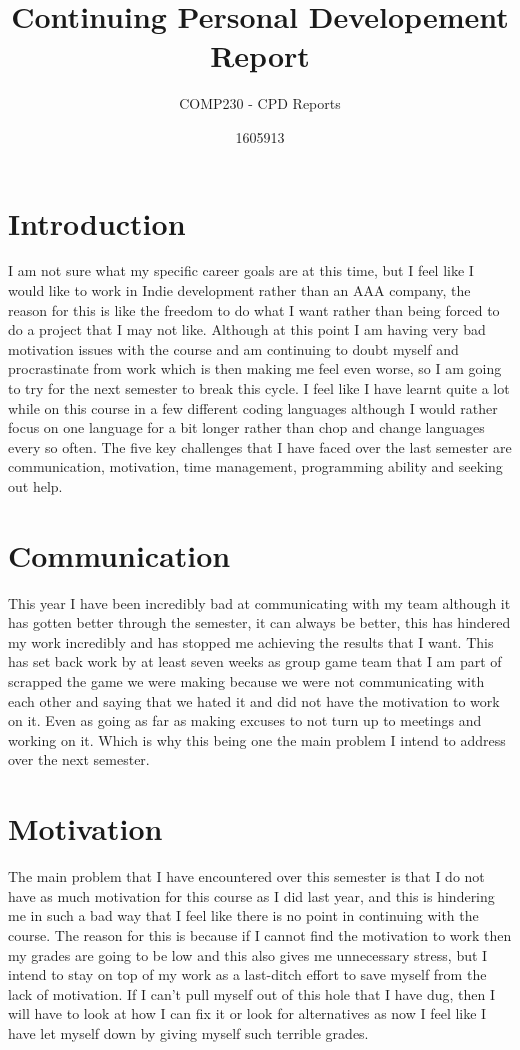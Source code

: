 \documentclass[11pt]{scrartcl}
\title{Continuing Personal Developement Report}
\subtitle{COMP230 - CPD Reports}
\author{1605913}
\begin{document}
\maketitle


\section*{Introduction}

I am not sure what my specific career goals are at this time, but I feel like I would like to work in Indie development rather than an AAA company, the reason for this is like the freedom to do what I want rather than being forced to do a project that I may not like. Although at this point I am having very bad motivation issues with the course and am continuing to doubt myself and procrastinate from work which is then making me feel even worse, so I am going to try for the next semester to break this cycle.
I feel like I have learnt quite a lot while on this course in a few different coding languages although I would rather focus on one language for a bit longer rather than chop and change languages every so often. The five key challenges that I have faced over the last semester are communication, motivation, time management, programming ability and seeking out help. 

\section{Communication}
This year I have been incredibly bad at communicating with my team although it has gotten better through the semester, it can always be better, this has hindered my work incredibly and has stopped me achieving the results that I want. This has set back work by at least seven weeks as group game team that I am part of scrapped the game we were making because we were not communicating with each other and saying that we hated it and did not have the motivation to work on it. Even as going as far as making excuses to not turn up to meetings and working on it. Which is why this being one the main problem I intend to address over the next semester.

\section{Motivation}
The main problem that I have encountered over this semester is that I do not have as much motivation for this course as I did last year, and this is hindering me in such a bad way that I feel like there is no point in continuing with the course. The reason for this is because if I cannot find the motivation to work then my grades are going to be low and this also gives me unnecessary stress, but I intend to stay on top of my work as a last-ditch effort to save myself from the lack of motivation. If I can't pull myself out of this hole that I have dug, then I will have to look at how I can fix it or look for alternatives as now I feel like I have let myself down by giving myself such terrible grades.
\end{document}
